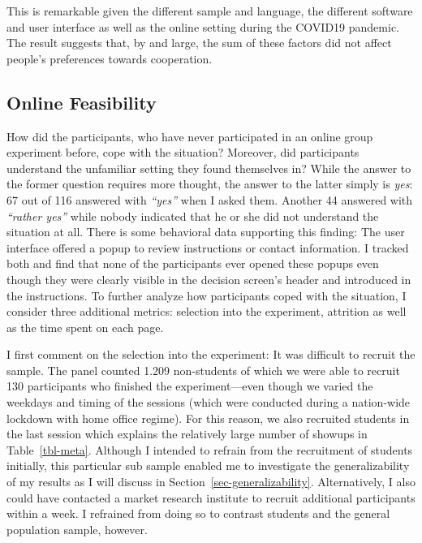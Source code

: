 \documentclass[
  authoryear,
  preprint,
  3p]{elsarticle}
\begin{document}
This is remarkable given the different sample and language, the
different software and user interface as well as the online setting
during the COVID19 pandemic. The result suggests that, by and large, the
sum of these factors did not affect people's preferences towards
cooperation.

\hypertarget{sec-feasibility}{%
\subsection{Online Feasibility}\label{sec-feasibility}}

How did the participants, who have never participated in an online group
experiment before, cope with the situation? Moreover, did participants
understand the unfamiliar setting they found themselves in? While the
answer to the former question requires more thought, the answer to the
latter simply is \emph{yes}: 67 out of 116 answered with \emph{``yes''}
when I asked them. Another 44 answered with \emph{``rather yes''} while
nobody indicated that he or she did not understand the situation at all.
There is some behavioral data supporting this finding: The user
interface offered a popup to review instructions or contact information.
I tracked both and find that none of the participants ever opened these
popups even though they were clearly visible in the decision screen's
header and introduced in the instructions. To further analyze how
participants coped with the situation, I consider three additional
metrics: selection into the experiment, attrition as well as the time
spent on each page.

I first comment on the selection into the experiment: It was difficult
to recruit the sample. The panel counted 1.209 non-students of which we
were able to recruit 130 participants who finished the experiment---even
though we varied the weekdays and timing of the sessions (which were
conducted during a nation-wide lockdown with home office regime). For
this reason, we also recruited students in the last session which
explains the relatively large number of showups in Table~\ref{tbl-meta}.
Although I intended to refrain from the recruitment of students
initially, this particular sub sample enabled me to investigate the
generalizability of my results as I will discuss in
Section~\ref{sec-generalizability}. Alternatively, I also could have
contacted a market research institute to recruit additional participants
within a week. I refrained from doing so to contrast students and the
general population sample, however.
\end{document}

